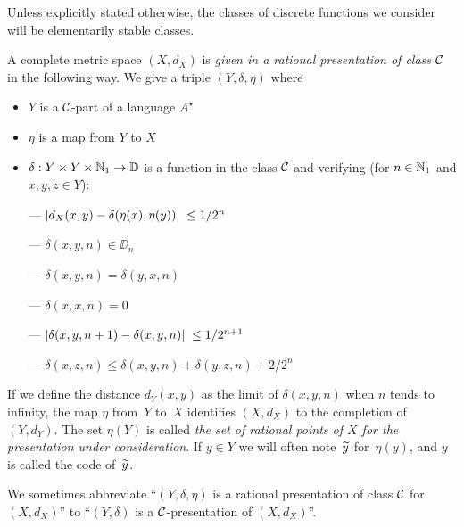 Unless explicitly stated otherwise, the classes of discrete functions we consider will be elementarily stable classes.

\begin{definition} \label{211}


\noindent 
A complete metric space $(X, d_X)$ is {\em given in a rational presentation of class ${{\cal C}}$} in the following way. We give a triple $(Y, \delta, \eta)$ where
\begin{itemize}

\item $Y$ is a ${{\cal C}}$-part of a language $A^{\star}$

\item  $\eta$ is a map from $Y$ to $X$

\item $\delta: Y\times Y\times \mathbb {N}_1\to
\mathbb {D}$ is a function in the class ${{\cal C}}$ and verifying (for $n\in\mathbb {N}_1$ and $x , y , z \in Y$):

\noindent 
--- $\left|{d_X(x,y)-\delta(\eta(x),\eta(y))}\right|\; \leq 1/2^n$

\noindent 
--- $\delta(x,y,n) \in \DD_n $

\noindent 
--- $\delta(x,y,n) = \delta(y,x,n)$

\noindent 
--- $\delta(x,x,n) = $0

\noindent 
--- $\left|{\delta(x,y,n+1)-\delta(x,y,n)}\right|\; \leq 1/2^{n+1}$

\noindent 
--- $\delta(x,z,n) \leq \delta(x,y,n) + \delta(y,z,n) + 2/2^n$ 
\end{itemize}
If we define the distance $d_Y(x,y)$ as the limit of $\delta(x,y,n)$ when $n$ tends to infinity, the map $\eta$ from~$Y$ to~$X$ identifies $(X,d_X)$ to the completion of $(Y,d_Y)$.
The set $\eta(Y)$ is called {\em the set of rational points of $X$ for the presentation under consideration}. If $y \in Y$ we will often note~$\widetilde{y}$ for~$\eta(y)$, and $y$ is called the code of~$\widetilde{y}$.
\end{definition}

We sometimes abbreviate ``$(Y,\delta,\eta)$ is a rational presentation of class ${{\cal C}}$ for $(X,d_X)$'' to ``$(Y,\delta)$ is a ${{\cal C}}$-presentation of $(X,d_X)$''.

